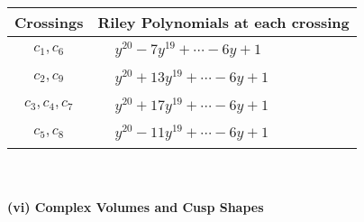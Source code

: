 \documentclass[1p]{elsarticle_modified}
\theoremstyle{definition}
\begin{document}
\begin{tabular}{m{50pt}|m{274pt}}
Crossings & \hspace{64pt}Riley Polynomials at each crossing \\
\hline $$\begin{aligned}c_{1},c_{6}\end{aligned}$$&$\begin{aligned}
&y^{20}-7 y^{19}+\cdots-6 y+1
\end{aligned}$\\
\hline $$\begin{aligned}c_{2},c_{9}\end{aligned}$$&$\begin{aligned}
&y^{20}+13 y^{19}+\cdots-6 y+1
\end{aligned}$\\
\hline $$\begin{aligned}c_{3},c_{4},c_{7}\end{aligned}$$&$\begin{aligned}
&y^{20}+17 y^{19}+\cdots-6 y+1
\end{aligned}$\\
\hline $$\begin{aligned}c_{5},c_{8}\end{aligned}$$&$\begin{aligned}
&y^{20}-11 y^{19}+\cdots-6 y+1
\end{aligned}$\\
\hline
\end{tabular}\\~\\
\newpage\flushleft \textbf{(vi) Complex Volumes and Cusp Shapes}
\end{document}

